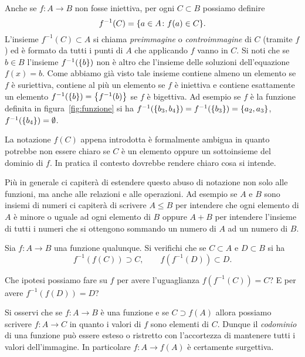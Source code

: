 Anche se $f\colon A \to B$ non fosse iniettiva,
per ogni $C\subset B$ possiamo definire
\[
  f^{-1}(C) = {\left\{ a\in A\colon f(a) \in C \right\}}.
\]
L'insieme $f^{-1}(C)\subset A$ si chiama \emph{preimmagine}
o \emph{controimmagine}
%
%
%
%
%
di $C$ (tramite $f$)
ed è formato da tutti i punti di $A$ che applicando $f$ vanno in $C$.
Si noti che se $b\in B$ l'insieme $f^{-1}({\left\{ b \right\}})$ non è altro che
l'insieme delle soluzioni dell'equazione $f(x)=b$. Come abbiamo
già visto tale insieme contiene almeno un elemento se $f$ è suriettiva,
contiene al più un elemento se $f$ è iniettiva e contiene esattamente
un elemento $f^{-1}({\left\{ b \right\}}) = {\left\{ f^{-1}(b) \right\}}$ se $f$ è bigettiva.
Ad esempio se $f$ è la funzione definita in figura~\ref{fig:funzione}
si ha $f^{-1}({\left\{ b_3,b_4 \right\}}) = f^{-1}({\left\{ b_3 \right\}}) = {\left\{ a_2,a_3 \right\}}$,
$f^{-1}({\left\{ b_4 \right\}}) = \emptyset$.


La notazione $f(C)$ appena introdotta è formalmente ambigua in quanto
potrebbe non essere chiaro se $C$ è un elemento oppure un sottoinsieme
del dominio di $f$.
In pratica il contesto dovrebbe rendere chiaro cosa si intende.

Più in generale ci capiterà di estendere questo abuso di notazione non solo
alle funzioni, ma anche alle relazioni e alle operazioni.
Ad esempio se $A$ e $B$ sono insiemi di numeri ci capiterà di scrivere $A\le B$
per intendere che ogni elemento di $A$ è minore o uguale ad ogni elemento di $B$
oppure $A+B$ per intendere l'insieme di tutti i numeri che si ottengono sommando
un numero di $A$ ad un numero di $B$.

\begin{exercise}
  Sia $f\colon A \to B$ una funzione qualunque. 
  Si verifichi che se $C\subset A$ e $D\subset B$ si ha 
  \[
    f^{-1}(f(C))\supset C,
    \qquad 
    f(f^{-1}(D)) \subset D. 
  \]
  
  Che ipotesi possiamo fare su $f$ per avere l'uguaglianza
  $f(f^{-1}(C)) = C$?
  E per avere $f^{-1}(f(D)) = D$?
\end{exercise}

Si osservi che se $f\colon A \to B$ è una funzione e 
se $C\supset f(A)$ allora possiamo scrivere $f\colon A \to C$ in quanto 
i valori di $f$ sono elementi di $C$. Dunque il \emph{codominio} di una 
funzione può essere esteso o ristretto con l'accortezza di mantenere 
tutti i valori dell'immagine. 
In particolare $f\colon A \to f(A)$ è certamente surgettiva.

